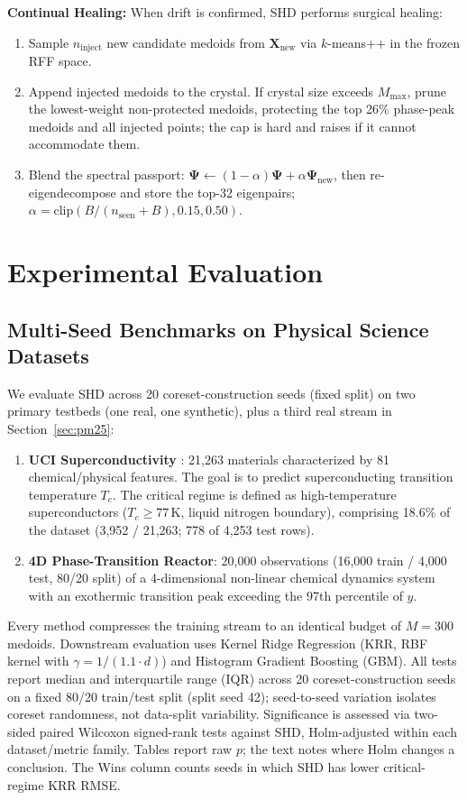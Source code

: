 \documentclass[11pt,a4paper]{article}
\begin{document}
\textbf{Continual Healing:} When drift is confirmed, SHD performs surgical healing:
\begin{enumerate}
    \item Sample $n_{\text{inject}}$ new candidate medoids from $\mathbf{X}_{\text{new}}$ via $k$-means++ in the frozen RFF space.
    \item Append injected medoids to the crystal. If crystal size exceeds $M_{\max}$, prune the lowest-weight non-protected medoids, protecting the top 26\% phase-peak medoids and all injected points; the cap is hard and raises if it cannot accommodate them.
    \item Blend the spectral passport: $\boldsymbol{\Psi} \leftarrow (1-\alpha)\boldsymbol{\Psi} + \alpha \boldsymbol{\Psi}_{\text{new}}$, then re-eigendecompose and store the top-32 eigenpairs; $\alpha = \text{clip}(B / (n_{\text{seen}} + B), 0.15, 0.50)$.
\end{enumerate}

\section{Experimental Evaluation}

\subsection{Multi-Seed Benchmarks on Physical Science Datasets}

We evaluate SHD across 20 coreset-construction seeds (fixed split) on two primary testbeds (one real, one synthetic), plus a third real stream in Section~\ref{sec:pm25}:
\begin{enumerate}
    \item \textbf{UCI Superconductivity} \citep{hamidieh2018data}: 21,263 materials characterized by 81 chemical/physical features. The goal is to predict superconducting transition temperature $T_c$. The critical regime is defined as high-temperature superconductors ($T_c \ge 77\,\mathrm{K}$, liquid nitrogen boundary), comprising 18.6\% of the dataset (3,952 / 21,263; 778 of 4,253 test rows).
    \item \textbf{4D Phase-Transition Reactor}: 20,000 observations (16,000 train / 4,000 test, 80/20 split) of a 4-dimensional non-linear chemical dynamics system with an exothermic transition peak exceeding the 97th percentile of $y$.
\end{enumerate}

Every method compresses the training stream to an identical budget of $M = 300$ medoids. Downstream evaluation uses Kernel Ridge Regression (KRR, RBF kernel with $\gamma = 1 / (1.1 \cdot d)$) and Histogram Gradient Boosting (GBM). All tests report median and interquartile range (IQR) across 20 coreset-construction seeds on a fixed 80/20 train/test split (split seed 42); seed-to-seed variation isolates coreset randomness, not data-split variability. Significance is assessed via two-sided paired Wilcoxon signed-rank tests against SHD, Holm-adjusted within each dataset/metric family. Tables report raw $p$; the text notes where Holm changes a conclusion. The Wins column counts seeds in which SHD has lower critical-regime KRR RMSE.
\end{document}
